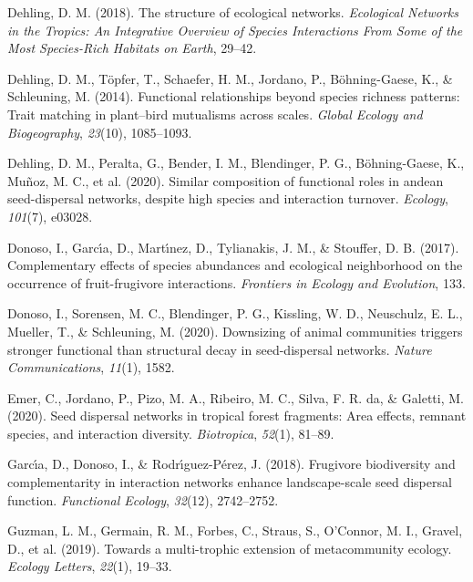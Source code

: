 \documentclass[
]{agujournal2019}
\newlength{\cslhangindent}
\newenvironment{CSLReferences}[2] %
 {\begin{list}{}{%
  \setlength{\itemindent}{0pt}
  \setlength{\leftmargin}{0pt}
  \setlength{\parsep}{0pt}
  \ifodd #1
   \setlength{\leftmargin}{\cslhangindent}
   \setlength{\itemindent}{-1\cslhangindent}
  \fi
  \setlength{\itemsep}{#2\baselineskip}}}
 {\end{list}}
\begin{document}
\begin{CSLReferences}{1}{0}
Dehling, D. M. (2018). The structure of ecological networks.
\emph{Ecological Networks in the Tropics: An Integrative Overview of
Species Interactions From Some of the Most Species-Rich Habitats on
Earth}, 29--42.

Dehling, D. M., Töpfer, T., Schaefer, H. M., Jordano, P., Böhning-Gaese,
K., \& Schleuning, M. (2014). Functional relationships beyond species
richness patterns: Trait matching in plant--bird mutualisms across
scales. \emph{Global Ecology and Biogeography}, \emph{23}(10),
1085--1093.

Dehling, D. M., Peralta, G., Bender, I. M., Blendinger, P. G.,
Böhning-Gaese, K., Muñoz, M. C., et al. (2020). Similar composition of
functional roles in andean seed-dispersal networks, despite high species
and interaction turnover. \emph{Ecology}, \emph{101}(7), e03028.

Donoso, I., Garcı́a, D., Martı́nez, D., Tylianakis, J. M., \& Stouffer, D.
B. (2017). Complementary effects of species abundances and ecological
neighborhood on the occurrence of fruit-frugivore interactions.
\emph{Frontiers in Ecology and Evolution}, 133.

Donoso, I., Sorensen, M. C., Blendinger, P. G., Kissling, W. D.,
Neuschulz, E. L., Mueller, T., \& Schleuning, M. (2020). Downsizing of
animal communities triggers stronger functional than structural decay in
seed-dispersal networks. \emph{Nature Communications}, \emph{11}(1),
1582.

Emer, C., Jordano, P., Pizo, M. A., Ribeiro, M. C., Silva, F. R. da, \&
Galetti, M. (2020). Seed dispersal networks in tropical forest
fragments: Area effects, remnant species, and interaction diversity.
\emph{Biotropica}, \emph{52}(1), 81--89.

Garcı́a, D., Donoso, I., \& Rodrı́guez-Pérez, J. (2018). Frugivore
biodiversity and complementarity in interaction networks enhance
landscape-scale seed dispersal function. \emph{Functional Ecology},
\emph{32}(12), 2742--2752.

Guzman, L. M., Germain, R. M., Forbes, C., Straus, S., O'Connor, M. I.,
Gravel, D., et al. (2019). Towards a multi-trophic extension of
metacommunity ecology. \emph{Ecology Letters}, \emph{22}(1), 19--33.


\end{CSLReferences}
\end{document}
